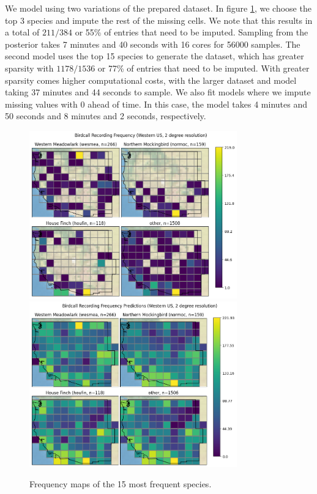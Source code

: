 \documentclass[notitlepage]{article}
\begin{document}
We model using two variations of the prepared dataset.
In figure \ref{fig:map_4}, we choose the top 3 species and impute the rest of the missing cells.
We note that this results in a total of $211/384$ or 55\% of entries that need to be imputed.
Sampling from the posterior takes 7 minutes and 40 seconds with 16 cores for 56000 samples.
The second model uses the top 15 species to generate the dataset, which has greater sparsity with $1178/1536$ or 77\% of entries that need to be imputed.
With greater sparsity comes higher computational costs, with the larger dataset and model taking 37 minutes and 44 seconds to sample.
We also fit models where we impute missing values with 0 ahead of time.
In this case, the model takes 4 minutes and 50 seconds and 8 minutes and 2 seconds, respectively.

\begin{figure}[H]
\centering
\includegraphics[width=0.8\textwidth]{report/figures/western_us_raw_4.png}
\includegraphics[width=0.8\textwidth]{report/figures/western_us_predict_4.png}
\caption{Frequency maps of the 15 most frequent species.}
\label{fig:map_4}
\end{figure}
\end{document}
